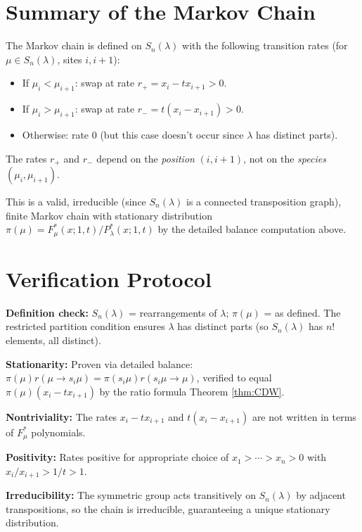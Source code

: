 \documentclass[12pt]{article}
\begin{document}
\section{Summary of the Markov Chain}

The Markov chain is defined on $S_n(\lambda)$ with the following transition rates (for $\mu \in S_n(\lambda)$, sites $i, i+1$):
\begin{itemize}
\item If $\mu_i < \mu_{i+1}$: swap at rate $r_+ = x_i - tx_{i+1} > 0$.
\item If $\mu_i > \mu_{i+1}$: swap at rate $r_- = t(x_i - x_{i+1}) > 0$.
\item Otherwise: rate $0$ (but this case doesn't occur since $\lambda$ has distinct parts).
\end{itemize}

The rates $r_+$ and $r_-$ depend on the \emph{position} $(i, i+1)$, not on the \emph{species} $(\mu_i, \mu_{i+1})$.

This is a valid, irreducible (since $S_n(\lambda)$ is a connected transposition graph), finite Markov chain with stationary distribution $\pi(\mu) = F^*_\mu(x;1,t)/P^*_\lambda(x;1,t)$ by the detailed balance computation above.

\section{Verification Protocol}

\textbf{Definition check:} $S_n(\lambda)$ = rearrangements of $\lambda$; $\pi(\mu)$ = as defined. The restricted partition condition ensures $\lambda$ has distinct parts (so $S_n(\lambda)$ has $n!$ elements, all distinct).

\textbf{Stationarity:} Proven via detailed balance: $\pi(\mu) r(\mu \to s_i\mu) = \pi(s_i\mu) r(s_i\mu \to \mu)$, verified to equal $\pi(\mu)(x_i - tx_{i+1})$ by the ratio formula Theorem \ref{thm:CDW}.

\textbf{Nontriviality:} The rates $x_i - tx_{i+1}$ and $t(x_i - x_{i+1})$ are not written in terms of $F^*_\mu$ polynomials.

\textbf{Positivity:} Rates positive for appropriate choice of $x_1 > \cdots > x_n > 0$ with $x_i/x_{i+1} > 1/t > 1$.

\textbf{Irreducibility:} The symmetric group acts transitively on $S_n(\lambda)$ by adjacent transpositions, so the chain is irreducible, guaranteeing a unique stationary distribution.
\end{document}
